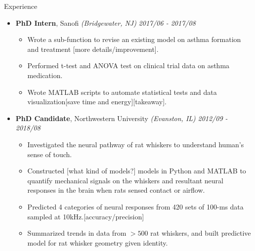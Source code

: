 \documentclass{resume} %
\begin{document}
\begin{rSection}{Experience}
\begin{itemize}
	\item {\bf PhD Intern}{, Sanofi \textit{(Bridgewater, NJ)}} \hfill {\em 2017/06 - 2017/08}\\
	\vspace{-5mm}
	\begin{itemize}
		\setlength\itemsep{-1.75em}	
		\item Wrote a sub-function to revise an existing model on asthma formation and treatment [more details/improvement].\\
		\item Performed t-test and ANOVA test on clinical trial data on asthma medication.\\ 
		\item Wrote MATLAB scripts to automate statistical tests and data visualization[save time and energy][takeaway].
	\end{itemize}

	\item {\bf PhD Candidate}{, Northwestern University \textit{(Evanston, IL)}} \hfill {\em 2012/09 - 2018/08}\\
	\vspace{-5mm}
	\begin{itemize}
		\setlength\itemsep{-1.75em}
		\item Investigated the neural pathway of rat whiskers to understand human's sense of touch.\\
		\item Constructed [what kind of models?] models in Python and MATLAB to quantify mechanical signals on the whiskers and resultant neural responses in the brain when rats sensed contact or airflow.\\
		\item Predicted 4 categories of neural responses from 420 sets of 100-ms data sampled at 10kHz.[accuracy/precision]\\
		\item Summarized trends in data from $>500$ rat whiskers, and built predictive model for rat whisker geometry given identity.	
	\end{itemize}

	
	\end{itemize}

\end{rSection}
\end{document}
